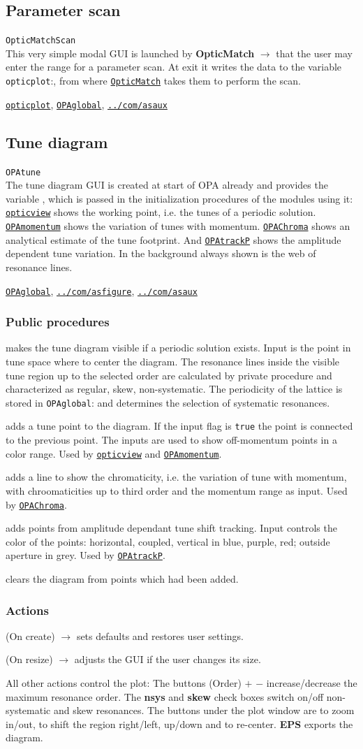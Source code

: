 \documentclass[12pt]{article}
\newcommand\code[1]{{\tt #1}}
\newcommand{\ofld}[1]{\colorbox{black!15}{{\bf #1}}}
\newcommand{\ofldx}[1]{\colorbox{black!15}{(#1)}}
\newcommand\guico[1]{{\color{blue}\code{#1}}}
\newcommand{\unico}[1]{{\color{burntorange}\code{#1}}}
\newcommand{\evcod}[2]{\ofld{#1} $\rightarrow$ \guico{#2}}
\newcommand{\evcodx}[2]{\ofldx{#1} $\rightarrow$ \guico{#2}}
\newcommand{\vrcod}[2]{\opauni{#1}:\unico{#2}}
\newcommand{\opagui}[1]{\colorbox{blue!20}{\code{#1}}}
\newcommand{\oguih}[2]{\subsection{\label{#2}#1}{\Huge\opagui{#2}}\\}
\newcommand{\ogui}[1]{\hyperref[#1]{\opagui{#1}}}
\newcommand{\opaguif}[1]{\colorbox{violet!30}{\code{#1}}}
\newcommand{\oguif}[1]{\hyperref[#1]{\opaguif{#1}}}
\newcommand{\opauni}[1]{\colorbox{orange!30}{\code{#1}}}
\newcommand{\ouni}[1]{\hyperref[#1]{\opauni{#1}}}
\newcommand{\uses}[1]{\flushleft {\bf Uses:} #1}
\newcommand{\desc}[1]{#1}
\newcommand{\act}[1]{\subsubsection*{Actions} #1}
\newcommand{\ppro}[1]{\subsubsection*{Public procedures} #1}
\begin{document}
\oguih{Parameter scan}{OpticMatchScan}

\desc{This very simple modal GUI is launched by \evcod{OpticMatch}{ScanClick} that the user may enter the range for a parameter scan. At exit it writes the data to the variable \vrcod{opticplot}{ScanPar}, from where \ogui{OpticMatch} takes them to perform the scan.}

\uses{\ouni{opticplot}, \ouni{OPAglobal}, \ouni{../com/asaux}} 


\oguih{Tune diagram}{OPAtune}

\desc{The tune diagram GUI is created at start of OPA already and provides the variable \guico{tuneplot}, which is passed in the initialization procedures of the modules using it: \ogui{opticview} shows the working point, i.e. the tunes of a periodic solution. \ogui{OPAmomentum} shows the variation of tunes with momentum. \ogui{OPAChroma} shows an analytical estimate of the tune footprint. And \ogui{OPAtrackP} shows the amplitude dependent tune variation. In the background always shown is the web of resonance lines.}

\uses{\ouni{OPAglobal}, \oguif{../com/asfigure}, \ouni{../com/asaux}}

\ppro{
\guico{Diagram} makes the tune diagram visible if a periodic solution exists. Input is the point in tune space where to center the diagram.  The resonance lines inside the visible tune region up to the selected order are calculated by private procedure \unico{getLines} and characterized as regular, skew, non-systematic.  The periodicity of the lattice is stored in \vrcod{OPAglobal}{NPer} and determines the selection of systematic resonances. 

\guico{AddTunePoint} adds a tune point to the diagram. If the input flag \guico{connect} is \code{true} the point is connected to the previous point. The inputs \guico{dpp, dppmax} are used to show off-momentum points in a color range. Used by \ogui{opticview} and \ogui{OPAmomentum}.

\guico{AddChromLine} adds a line to show the chromaticity, i.e. the variation of tune with momentum, with chroomaticities up to third order and the momentum range as input. Used by \ogui{OPAChroma}.

\guico{AddTushPoint} adds points from amplitude dependant tune shift tracking. Input \guico{xmy} controls the color of the points: horizontal, coupled, vertical in blue, purple, red; outside aperture in grey. Used by \ogui{OPAtrackP}.

\guico{Refresh} clears the diagram from points which had been added.
}
\act{
\evcodx{On create}{FormCreate} sets defaults and restores user settings.

\evcodx{On resize}{FormResize} adjusts the GUI if the user changes its size.

All other actions control the plot: The buttons \ofldx{Order} \ofld{$+$} \ofld{$-$} increase/decrease the maximum resonance order. The \ofld{nsys} and \ofld{skew} check boxes switch on/off non-systematic and skew resonances. The buttons under the plot window are to zoom in/out, to shift the region right/left, up/down and to re-center. \ofld{EPS} exports the diagram.
}
\end{document}
